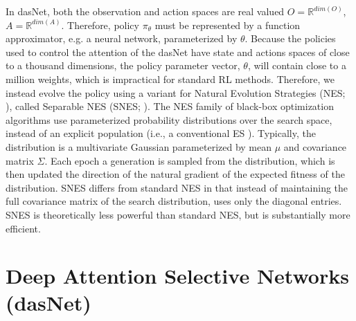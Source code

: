 In dasNet, both the
observation and action spaces are real valued $O = \mathds{R}^{dim(O)}$,
$A = \mathds{R}^{dim(A)}$.  Therefore,  policy $\pi_{\theta}$ must  be represented by a function
approximator, e.g. a neural network, parameterized by $\theta$. 
Because the policies used to control the attention of the dasNet have
state and actions spaces of close to a thousand dimensions, the policy
parameter vector, $\theta$, will contain close to a million weights,
which is impractical for standard RL methods.
Therefore, we instead evolve the policy using a variant for Natural
Evolution Strategies (NES; \cite{wierstra2008natural, glasmachers2010exponential}), 
called Separable NES (SNES; \cite{schaul2011high}).
The NES family of black-box optimization algorithms use parameterized
probability distributions over the search space, instead of an
explicit population (i.e., a conventional ES \cite{Rechenberg:71,Schwefel:74,Holland:75}).
Typically, the distribution is a multivariate Gaussian parameterized by mean $\mu$
and covariance matrix $\Sigma$.  Each epoch a generation is sampled
from the distribution, which is then updated the direction of the
natural gradient of the expected fitness of the distribution.  SNES
differs from standard NES in that instead of maintaining the full
covariance matrix of the search distribution, uses only the diagonal
entries.  SNES is theoretically less powerful than standard NES, but
is substantially more efficient.



\section{Deep Attention Selective Networks (dasNet)}
\label{sec:model}



